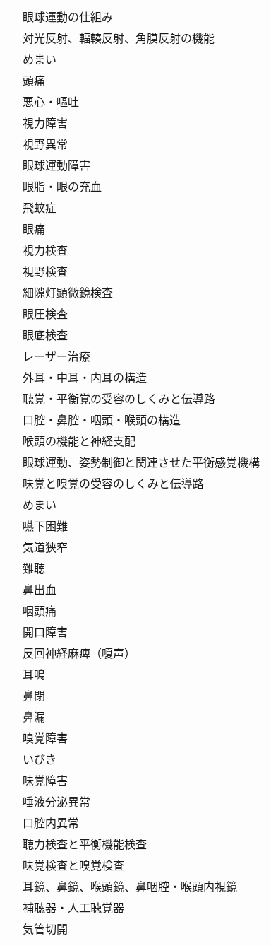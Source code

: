 \begin{xltabular}{\linewidth}{XX}
 & 眼球運動の仕組み \\
 & 対光反射、輻輳反射、角膜反射の機能 \\
 & めまい \\
 & 頭痛 \\
 & 悪心・嘔吐 \\
 & 視力障害 \\
 & 視野異常 \\
 & 眼球運動障害 \\
 & 眼脂・眼の充血 \\
 & 飛蚊症 \\
 & 眼痛 \\
 & 視力検査 \\
 & 視野検査 \\
 & 細隙灯顕微鏡検査 \\
 & 眼圧検査 \\
 & 眼底検査 \\
 & レーザー治療 \\
 & 外耳・中耳・内耳の構造 \\
 & 聴覚・平衡覚の受容のしくみと伝導路 \\
 & 口腔・鼻腔・咽頭・喉頭の構造 \\
 & 喉頭の機能と神経支配 \\
 & 眼球運動、姿勢制御と関連させた平衡感覚機構 \\
 & 味覚と嗅覚の受容のしくみと伝導路 \\
 & めまい \\
 & 嚥下困難 \\
 & 気道狭窄 \\
 & 難聴 \\
 & 鼻出血 \\
 & 咽頭痛 \\
 & 開口障害 \\
 & 反回神経麻痺（嗄声） \\
 & 耳鳴 \\
 & 鼻閉 \\
 & 鼻漏 \\
 & 嗅覚障害 \\
 & いびき \\
 & 味覚障害 \\
 & 唾液分泌異常 \\
 & 口腔内異常 \\
 & 聴力検査と平衡機能検査 \\
 & 味覚検査と嗅覚検査 \\
 & 耳鏡、鼻鏡、喉頭鏡、鼻咽腔・喉頭内視鏡 \\
 & 補聴器・人工聴覚器 \\
 & 気管切開 \\

\end{xltabular}
